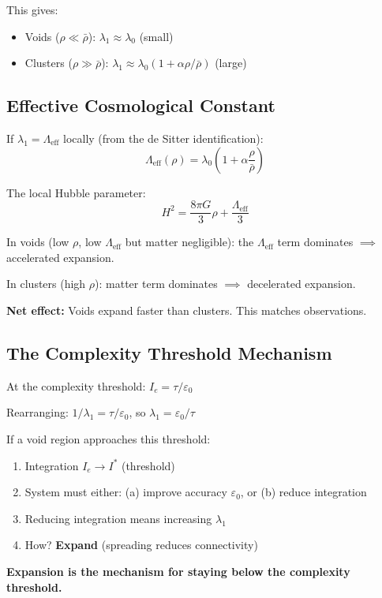 \documentclass[11pt,a4paper]{article}
\theoremstyle{plain}
\theoremstyle{definition}
\theoremstyle{remark}
\begin{document}
This gives:
\begin{itemize}[noitemsep]
    \item Voids ($\rho \ll \bar{\rho}$): $\lambda_1 \approx \lambda_0$ (small)
    \item Clusters ($\rho \gg \bar{\rho}$): $\lambda_1 \approx \lambda_0(1 + \alpha\rho/\bar{\rho})$ (large)
\end{itemize}

\subsection{Effective Cosmological Constant}

If $\lambda_1 = \Lambda_{\text{eff}}$ locally (from the de Sitter identification):
\[
\Lambda_{\text{eff}}(\rho) = \lambda_0 \left(1 + \alpha \frac{\rho}{\bar{\rho}}\right)
\]

The local Hubble parameter:
\[
H^2 = \frac{8\pi G}{3}\rho + \frac{\Lambda_{\text{eff}}}{3}
\]

In voids (low $\rho$, low $\Lambda_{\text{eff}}$ but matter negligible): the $\Lambda_{\text{eff}}$ term dominates $\implies$ accelerated expansion.

In clusters (high $\rho$): matter term dominates $\implies$ decelerated expansion.

\textbf{Net effect:} Voids expand faster than clusters. This matches observations.

\subsection{The Complexity Threshold Mechanism}

At the complexity threshold: $I_e = \tau/\varepsilon_0$

Rearranging: $1/\lambda_1 = \tau/\varepsilon_0$, so $\lambda_1 = \varepsilon_0/\tau$

If a void region approaches this threshold:
\begin{enumerate}[noitemsep]
    \item Integration $I_e \to I^*$ (threshold)
    \item System must either: (a) improve accuracy $\varepsilon_0$, or (b) reduce integration
    \item Reducing integration means increasing $\lambda_1$
    \item How? \textbf{Expand} (spreading reduces connectivity)
\end{enumerate}

\textbf{Expansion is the mechanism for staying below the complexity threshold.}
\end{document}
